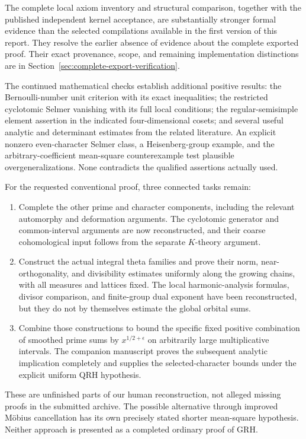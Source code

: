 \documentclass[11pt,a4paper]{article}
\theoremstyle{remark}
\begin{document}
The complete local axiom inventory and structural comparison, together
with the published independent kernel acceptance, are substantially
stronger formal evidence than the selected compilations available in
the first version of this report. They resolve the earlier absence of
evidence about the complete exported proof. Their exact provenance,
scope, and remaining implementation distinctions are in
Section~\ref{sec:complete-export-verification}.

The continued mathematical checks establish additional positive results:
the Bernoulli-number unit criterion with its exact inequalities; the
restricted cyclotomic Selmer vanishing with its full local conditions;
the regular-semisimple element assertion in the indicated four-dimensional
cosets; and several useful analytic and determinant estimates from the
related literature. An explicit nonzero even-character Selmer class,
a Heisenberg-group example, and the arbitrary-coefficient mean-square
counterexample test plausible overgeneralizations. None contradicts
the qualified assertions actually used.

For the requested conventional proof, three connected tasks remain:
\begin{enumerate}
\item Complete the other prime and character components,
      including the relevant automorphy and deformation arguments.
      The cyclotomic generator and common-interval arguments are now
      reconstructed, and their coarse cohomological input follows
      from the separate $K$-theory argument.
\item Construct the actual integral theta families and prove their
      norm, near-orthogonality, and divisibility estimates uniformly
      along the growing chains, with all measures and lattices fixed.
      The local harmonic-analysis formulas, divisor comparison, and
      finite-group dual exponent have been reconstructed, but they
      do not by themselves estimate the global orbital sums.
\item Combine those constructions to bound the specific fixed positive
      combination of smoothed prime sums by $x^{1/2+\epsilon}$ on
      arbitrarily large multiplicative intervals. The companion
      manuscript proves the subsequent analytic implication completely
      and supplies the selected-character bounds under the explicit
      uniform QRH hypothesis.
\end{enumerate}
These are unfinished parts of our human reconstruction, not alleged
missing proofs in the submitted archive. The possible alternative
through improved M\"obius cancellation has its own precisely stated
shorter mean-square hypothesis. Neither approach is presented as a
completed ordinary proof of GRH.
\end{document}
